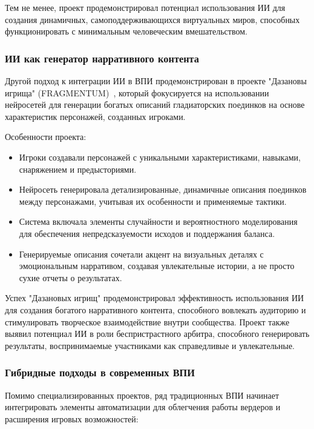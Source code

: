 Тем не менее, проект продемонстрировал потенциал использования ИИ для создания динамичных, самоподдерживающихся виртуальных миров, способных функционировать с минимальным человеческим вмешательством.

\subsubsection{ИИ как генератор нарративного контента}

Другой подход к интеграции ИИ в ВПИ продемонстрирован в проекте "Дазановы игрища" (FRAGMENTUM)~\cite{fragmentum}, который фокусируется на использовании нейросетей для генерации богатых описаний гладиаторских поединков на основе характеристик персонажей, созданных игроками.

Особенности проекта:

\begin{itemize}
    \item Игроки создавали персонажей с уникальными характеристиками, навыками, снаряжением и предысториями.

    \item Нейросеть генерировала детализированные, динамичные описания поединков между персонажами, учитывая их особенности и применяемые тактики.

    \item Система включала элементы случайности и вероятностного моделирования для обеспечения непредсказуемости исходов и поддержания баланса.

    \item Генерируемые описания сочетали акцент на визуальных деталях с эмоциональным нарративом, создавая увлекательные истории, а не просто сухие отчеты о результатах.
\end{itemize}

Успех "Дазановых игрищ" продемонстрировал эффективность использования ИИ для создания богатого нарративного контента, способного вовлекать аудиторию и стимулировать творческое взаимодействие внутри сообщества. Проект также выявил потенциал ИИ в роли беспристрастного арбитра, способного генерировать результаты, воспринимаемые участниками как справедливые и увлекательные.

\subsubsection{Гибридные подходы в современных ВПИ}

Помимо специализированных проектов, ряд традиционных ВПИ начинает интегрировать элементы автоматизации для облегчения работы вердеров и расширения игровых возможностей:

